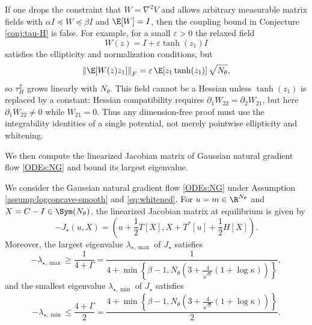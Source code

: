 \begin{remark}\label{rem:hessian-compatibility}
    If one drops the constraint that $W=\nabla^2 V$ and allows arbitrary measurable matrix fields with $\alpha I\preceq W\preceq \beta I$ and $\E[W]=I$, then the coupling bound in Conjecture \ref{conj:tau-H} is false. For example, for a small $\varepsilon>0$ the relaxed field
    \begin{equation*}
        W(z)=I+\varepsilon \tanh(z_1) I
    \end{equation*}
    satisfies the ellipticity and normalization conditions, but
    \begin{equation*}
        \left\|\E[W(z)z_1]\right\|_F
        =
        \varepsilon\,\E[z_1\tanh(z_1)]\,\sqrt{N_\theta},
    \end{equation*}
    so $\tau_H^2$ grows linearly with $N_\theta$. This field cannot be a Hessian unless $\tanh(z_1)$ is replaced by a constant: Hessian compatibility requires $\partial_1 W_{22}=\partial_2 W_{21}$, but here $\partial_1 W_{22}\neq 0$ while $W_{21}=0$. Thus any dimension-free proof must use the integrability identities of a single potential, not merely pointwise ellipticity and whitening.
\end{remark}

We then compute the linearized Jacobian matrix of Gaussian natural gradient flow \eqref{ODEs:NG} and bound its largest eigenvalue.

\begin{proposition}\label{prop:Jac-eig}
    We consider the Gaussian natural gradient flow \eqref{ODEs:NG} under Assumption \ref{assump:logconcave-smooth} and \eqref{eq:whitened}. For $u = m \in \R^{N_\theta}$ and $X = C - I \in \Sym (N_\theta)$, the linearized Jacobian matrix at equilibrium is given by
    \begin{equation*}
        - J_\star (u, X) = \left( u + \frac{1}{2} T[X], X + T^*[u] + \frac{1}{2} H[X] \right).
    \end{equation*}
    Moreover, the largest eigenvalue $\lambda_{\star, \max}$ of $J_\star$ satisfies
    \begin{equation*}
        -\lambda_{\star, \max} \geq \frac{1}{4 + \Gamma} = \frac{1}{4 + \min \left\{\beta - 1, N_\theta \left(3 + \frac{4}{\sqrt{\pi}} (1 + \log \kappa) \right) \right\}},
    \end{equation*}
    and the smallest eigenvalue $\lambda_{\star, \min}$ of $J_\star$ satisfies
    \begin{equation*}
        -\lambda_{\star, \min} \leq \frac{4 + \Gamma}{2} = \frac{4 + \min \left\{\beta - 1, N_\theta \left(3 + \frac{4}{\sqrt{\pi}} (1 + \log \kappa) \right) \right\}}{2}.
    \end{equation*}
\end{proposition}

